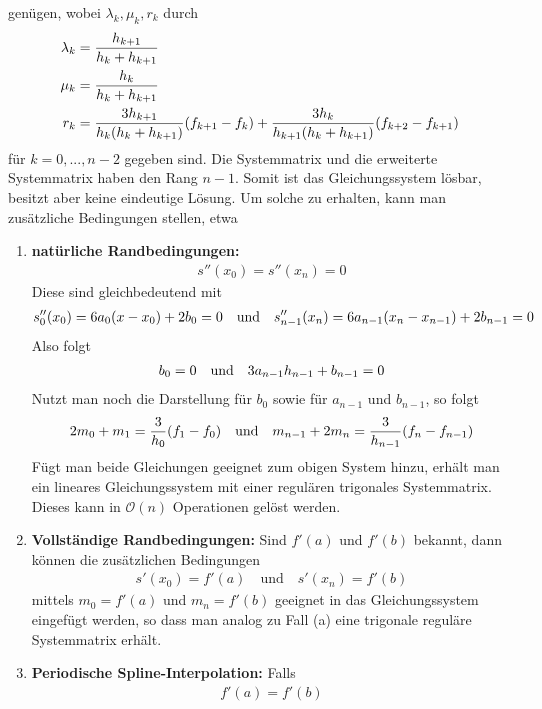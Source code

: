 genügen, wobei $\lambda_k,\mu_k,r_k$ durch
\begin{align}
	\lambda_k &= \frac{h_{k+1}}{h_k+h_{k+1}} \notag \\
	\mu_k &= \frac{h_k}{h_k + h_{k+1}}\notag \\
	r_k &= \frac{3h_{k+1}}{h_k(h_k+h_{k+1})}(f_{k+1}-f_k) + \frac{3h_k}{h_{k+1}(h_k+h_{k+1})}(f_{k+2} - f_{k+1})\notag
\end{align}
für $k=0,...,n-2$ gegeben sind. Die Systemmatrix und die erweiterte Systemmatrix haben den Rang $n-1$. Somit ist das Gleichungssystem lösbar, besitzt aber keine eindeutige Lösung. Um solche zu erhalten, kann man zusätzliche Bedingungen stellen, etwa
\begin{enumerate}[label=(\alph*)]
	\item \textbf{natürliche Randbedingungen:} 
	\begin{align}
		\label{1.12}
		s''(x_0) = s''(x_n)=0
	\end{align}
	Diese sind gleichbedeutend mit 
	\begin{align}
		s''_0(x_0)=6a_0(x-x_0)+2b_0=0\quad\text{und}\quad s''_{n-1}(x_n)=6a_{n-1}(x_n-x_{n-1})+2b_{n-1}=0\notag
	\end{align}
	Also folgt
	\begin{align}
		b_0=0\quad\text{und}\quad 3a_{n-1}h_{n-1} + b_{n-1}=0\notag
	\end{align}
	Nutzt man noch die Darstellung für $b_0$ sowie für $a_{n-1}$ und $b_{n-1}$, so folgt
	\begin{align}
		2m_0+m_1 = \frac{3}{h_0}(f_1-f_0) \quad\text{und}\quad m_{n-1}+2m_n=\frac{3}{h_{n-1}}(f_n-f_{n-1})\notag
	\end{align}
	Fügt man beide Gleichungen geeignet zum obigen System hinzu, erhält man ein lineares Gleichungssystem mit einer regulären trigonales Systemmatrix. Dieses kann in $\mathcal{O}(n)$ Operationen gelöst werden.
	\item \textbf{Vollständige Randbedingungen:} Sind $f'(a)$ und $f'(b)$ bekannt, dann können die zusätzlichen Bedingungen
	\begin{align}
		s'(x_0)=f'(a)\quad\text{und}\quad s'(x_n)=f'(b)
	\end{align}
	mittels $m_0=f'(a)$ und $m_n=f'(b)$ geeignet in das Gleichungssystem eingefügt werden, so dass man analog zu Fall (a) eine trigonale reguläre Systemmatrix erhält.
	\item \textbf{Periodische Spline-Interpolation:} Falls
	\begin{align}
		\label{1.14}
		f'(a)=f'(b)
	\end{align}

\end{enumerate}

